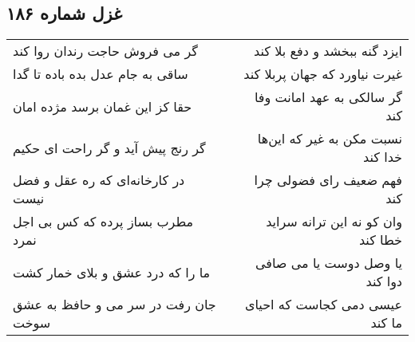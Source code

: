 \begin{center}
\section*{غزل شماره ۱۸۶}
\label{sec:sh186}
\begin{longtable}{l p{0.5cm} r}
گر می فروش حاجت رندان روا کند
&&
ایزد گنه ببخشد و دفع بلا کند
\\
ساقی به جام عدل بده باده تا گدا
&&
غیرت نیاورد که جهان پربلا کند
\\
حقا کز این غمان برسد مژده امان
&&
گر سالکی به عهد امانت وفا کند
\\
گر رنج پیش آید و گر راحت ای حکیم
&&
نسبت مکن به غیر که این‌ها خدا کند
\\
در کارخانه‌ای که ره عقل و فضل نیست
&&
فهم ضعیف رای فضولی چرا کند
\\
مطرب بساز پرده که کس بی اجل نمرد
&&
وان کو نه این ترانه سراید خطا کند
\\
ما را که درد عشق و بلای خمار کشت
&&
یا وصل دوست یا می صافی دوا کند
\\
جان رفت در سر می و حافظ به عشق سوخت
&&
عیسی دمی کجاست که احیای ما کند
\\
\end{longtable}
\end{center}
